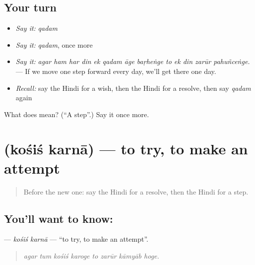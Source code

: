 \subsection*{Your turn}
\begin{itemize}
\raggedright
  \item \emph{Say it:} \emph{qadam}
  \item \emph{Say it:} \emph{qadam}, once more
  \item \emph{Say it:} \emph{agar ham har din ek qadam āge baṛheṅge to ek din zarūr pahuñceṅge.} — If we move one step forward every day, we'll get there one day.
  \item \emph{Recall:} say the Hindi for a wish, then the Hindi for a resolve, then say \emph{qadam} again
\end{itemize}

\begin{tcolorbox}[breakable,colback=teal!4,colframe=teal!35!black,title={Before you move on}]
What does  mean? (\textquotedblleft{}A step\textquotedblright{}.) Say it once more.
\end{tcolorbox}
\section[\texorpdfstring{\hi{कोशिश} \hi{करना} (kośiś karnā)}{कोशिश करना (kośiś karnā)}]{  (kośiś karnā) — to try, to make an attempt}

\label{lesson:HI-C390-kosiskarna}



\begin{quote}
Before the new one: say the Hindi for a resolve, then the Hindi for a step.
\end{quote}

\subsection*{You'll want to know:  }
\textbf{ } — \emph{kośiś karnā} — \textquotedblleft{}to try, to make an attempt\textquotedblright{}.

\begin{quote}
       
\end{quote}

\begin{quote}
\emph{agar tum kośiś karoge to zarūr kāmyāb hoge.}
\end{quote}

